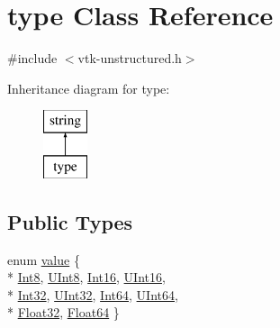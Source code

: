 \hypertarget{classtype}{}\section{type Class Reference}
\label{classtype}


{\ttfamily \#include $<$vtk-\/unstructured.\+h$>$}

Inheritance diagram for type\+:\begin{figure}[H]
\begin{center}
\leavevmode
\includegraphics[height=2.000000cm]{classtype}
\end{center}
\end{figure}
\subsection*{Public Types}
\begin{DoxyCompactItemize}
\item 
enum \hyperlink{classtype_a83781d700ce124b4224c316326a5a975}{value} \{ \\*
\hyperlink{classtype_a83781d700ce124b4224c316326a5a975ad559d992c88431b0a1cb90b340929d4e}{Int8}, 
\hyperlink{classtype_a83781d700ce124b4224c316326a5a975a82bbc808c985056ed74b30bcca131fad}{U\+Int8}, 
\hyperlink{classtype_a83781d700ce124b4224c316326a5a975a8d3d044c5da17c4e92e2c61c2f0ea556}{Int16}, 
\hyperlink{classtype_a83781d700ce124b4224c316326a5a975a36b08866238b21675704f38517929e69}{U\+Int16}, 
\\*
\hyperlink{classtype_a83781d700ce124b4224c316326a5a975a62e1ad64aa38ad0b50e1a6bd9b9ae25e}{Int32}, 
\hyperlink{classtype_a83781d700ce124b4224c316326a5a975acfca6c13984dbb7ac515cff88a01826e}{U\+Int32}, 
\hyperlink{classtype_a83781d700ce124b4224c316326a5a975a2cc7bf870db9a3b5e9e580a58b6c1308}{Int64}, 
\hyperlink{classtype_a83781d700ce124b4224c316326a5a975a64538f1914f2fd739bc876253b75fe4c}{U\+Int64}, 
\\*
\hyperlink{classtype_a83781d700ce124b4224c316326a5a975a1b5e448b6fc2bafbc9b5f8e4cc582834}{Float32}, 
\hyperlink{classtype_a83781d700ce124b4224c316326a5a975a72818204734582235e144a1e64563947}{Float64}
 \}
\end{DoxyCompactItemize}
